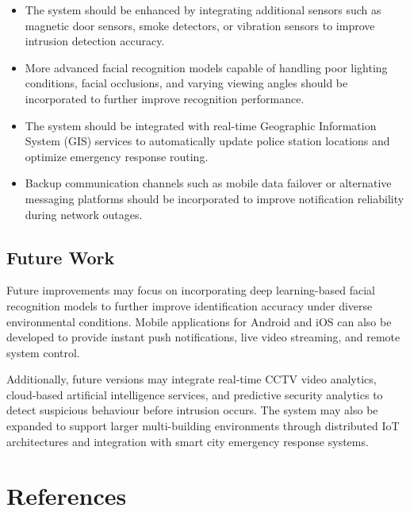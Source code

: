\documentclass[12pt,a4paper,oneside]{report}
\begin{document}
\begin{itemize}
  \item The system should be enhanced by integrating additional sensors such as magnetic door sensors, smoke detectors, or vibration sensors to improve intrusion detection accuracy.
  \item More advanced facial recognition models capable of handling poor lighting conditions, facial occlusions, and varying viewing angles should be incorporated to further improve recognition performance.
  \item The system should be integrated with real-time Geographic Information System (GIS) services to automatically update police station locations and optimize emergency response routing.
  \item Backup communication channels such as mobile data failover or alternative messaging platforms should be incorporated to improve notification reliability during network outages.
\end{itemize}

\section{Future Work}

Future improvements may focus on incorporating deep learning-based facial recognition models to further improve identification accuracy under diverse environmental conditions. Mobile applications for Android and iOS can also be developed to provide instant push notifications, live video streaming, and remote system control.

Additionally, future versions may integrate real-time CCTV video analytics, cloud-based artificial intelligence services, and predictive security analytics to detect suspicious behaviour before intrusion occurs. The system may also be expanded to support larger multi-building environments through distributed IoT architectures and integration with smart city emergency response systems.

\clearpage
\chapter*{References}
\end{document}
